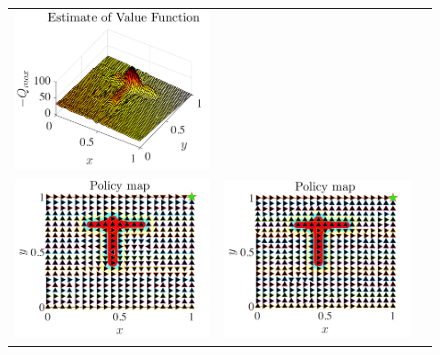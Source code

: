 \documentclass[preprint,12pt,authoryear]{elsarticle}
\begin{document}
\begin{figure}[t]
\begin{center}
\begin{tabular}[h]{ccc}
\includegraphics[scale=0.30]{figures/puddleWorld-kwta-value.pdf}     \\
\includegraphics[scale=0.30]{figures/puddleWorld-linear-policy.pdf}  &
\includegraphics[scale=0.30]{figures/puddleWorld-bp-policy.pdf}      &

\end{tabular}
\end{center}
\end{figure}
\end{document}
